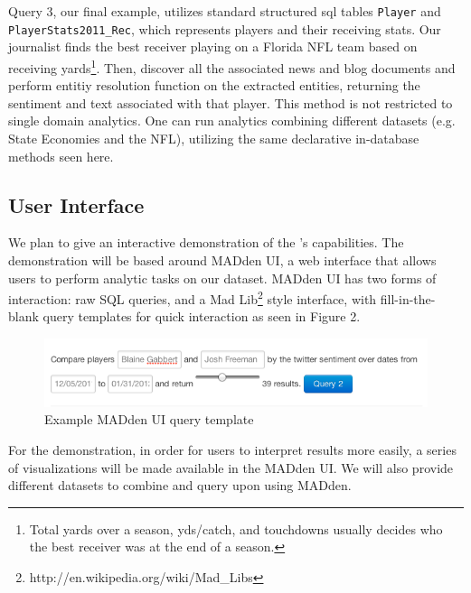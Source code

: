 Query 3, our final example, utilizes standard structured sql tables {\tt Player}
and {\tt PlayerStats2011\_Rec}, which represents players and their receiving
stats. Our journalist finds the best receiver playing on a Florida NFL team
based on receiving yards\footnote{Total yards over a season, yds/catch, and
touchdowns usually decides who the best receiver was at the end of a season.}.
Then, discover all the associated news and blog documents and perform entitiy
resolution function on the extracted entities, returning the sentiment and text
associated with that player. This method is not restricted to single domain
analytics. One can run analytics combining different datasets (e.g. State
Economies and the NFL), utilizing the same declarative in-database methods seen
here.

\subsection{User Interface}

We plan to give an interactive demonstration of the 
{\system}'s capabilities. The demonstration will be based around MADden UI,
a web interface that allows users to perform analytic tasks on our dataset.
MADden UI has two forms of interaction: raw SQL queries, and a Mad
Lib\footnote{http://en.wikipedia.org/wiki/Mad\_Libs} style interface, with
fill-in-the-blank query templates for quick interaction as seen in Figure
2.

\begin{figure}
\begin{center}
	\includegraphics[scale=.43]{content/graphics/example_madlib.png}
\end{center}
\caption{Example MADden UI query template} 
\label{fig:madlib}
\end{figure}

For the demonstration, in order for users to interpret results more 
easily, a series of
visualizations will be made available in the MADden UI. We will also provide
different datasets to combine and query upon using MADden.


